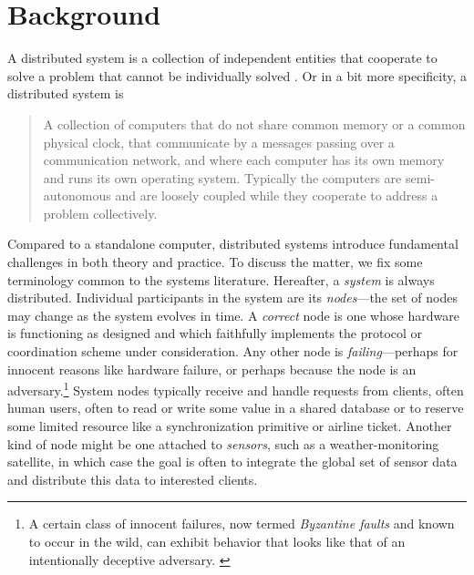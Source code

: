 \section{Background}
A distributed system is a collection of independent entities that cooperate to
solve a problem that cannot be individually solved
\cite{kshemkalyani_singhal_2008}. Or in a bit more specificity, a distributed
system is
\begin{quotation}
   A collection of computers that do not share common memory or a common
   physical clock, that communicate by a messages passing over a communication
   network, and where each computer has its own memory and runs its own
   operating system. Typically the computers are semi-autonomous and are loosely
   coupled while they cooperate to address a problem collectively.
   \cite{10.5555/562065}
\end{quotation}
Compared to a standalone computer, distributed systems introduce fundamental
challenges in both theory and practice. To discuss the matter, we fix some
terminology common to the systems literature. Hereafter, a \emph{system} is
always distributed. Individual participants in the system are its
\emph{nodes}---the set of nodes may change as the system evolves in time. A
\emph{correct} node is one whose hardware is functioning as designed and which
faithfully implements the protocol or coordination scheme under consideration.
Any other node is \emph{failing}---perhaps for innocent reasons like hardware
failure, or perhaps because the node is an adversary.\footnote{A certain class
of innocent failures, now termed \emph{Byzantine faults} and known to occur in
the wild, can exhibit behavior that looks like that of an intentionally
deceptive adversary. \cite{1979Sift}} System nodes typically receive and handle
requests from clients, often human users, often to read or write some value in a
shared database or to reserve some limited resource like a synchronization
primitive or airline ticket. Another kind of node might be one attached to
\emph{sensors}, such as a weather-monitoring satellite, in which case the goal
is often to integrate the global set of sensor data and distribute this data to
interested clients.

